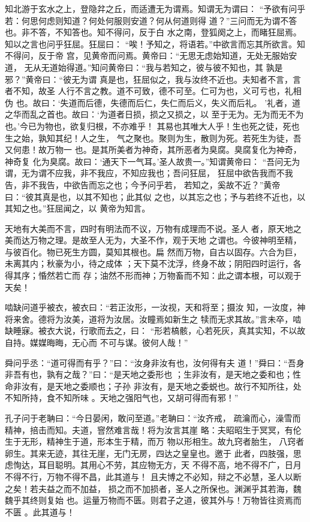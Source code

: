 \documentclass[12pt,UTF8]{ctexbook}
\begin{document}
知北游于玄水之上，登隐弅之丘，而适遭无为谓焉。知谓无为谓曰： “予欲有问乎若：何思何虑则知道？何处何服则安道？何从何道则得 道？”三问而无为谓不答也。非不答，不知答也。知不得问，反于白 水之南，登狐阕之上，而睹狂屈焉。知以之言也问乎狂屈。狂屈曰： “唉！予知之，将语若。”中欲言而忘其所欲言。知不得问，反于帝 宫，见黄帝而问焉。黄帝曰：“无思无虑始知道，无处无服始安道， 无从无道始得道。”知问黄帝曰：“我与若知之，彼与彼不知也，其 孰是邪？”黄帝曰：“彼无为谓 真是也，狂屈似之，我与汝终不近也。夫知者不言，言者不知，故圣 人行不言之教。道不可致，德不可至。仁可为也，义可亏也，礼相伪 也。故曰：‘失道而后德，失德而后仁，失仁而后义，失义而后礼。 ’礼者，道之华而乱之首也。故曰：‘为道者日损，损之又损之，以 至于无为。无为而无不为也。’今已为物也，欲复归根，不亦难乎！ 其易也其唯大人乎！生也死之徒，死也生之始，孰知其纪！人之生， 气之聚也。聚则为生，散则为死。若死生为徒，吾又何患！故万物一 也。是其所美者为神奇，其所恶者为臭腐。臭腐复化为神奇，神奇复 化为臭腐。故曰：‘通天下一气耳。’圣人故贵一。”知谓黄帝曰： “吾问无为谓，无为谓不应我，非不我应，不知应我也；吾问狂屈， 狂屈中欲告我而不我告，非不我告，中欲告而忘之也；今予问乎若， 若知之，奚故不近？”黄帝曰：“彼其真是也，以其不知也；此其似 之也，以其忘之也；予与若终不近也，以其知之也。”狂屈闻之，以 黄帝为知言。

天地有大美而不言，四时有明法而不议，万物有成理而不说。圣人 者，原天地之美而达万物之理。是故至人无为，大圣不作，观于天地 之谓也。今彼神明至精，与彼百化。物已死生方圆，莫知其根也。扁 然而万物，自古以固存。六合为巨，未离其内；秋豪为小，待之成体 ；天下莫不沈浮，终身不故；阴阳四时运行，各得其序；惛然若亡而 存；油然不形而神；万物畜而不知：此之谓本根，可以观于天矣！

啮缺问道乎被衣，被衣曰：“若正汝形，一汝视，天和将至；摄汝 知，一汝度，神将来舍。德将为汝美，道将为汝居。汝瞳焉如新生之 犊而无求其故。”言未卒，啮缺睡寐。被衣大说，行歌而去之，曰： “形若槁骸，心若死灰，真其实知，不以故自持。媒媒晦晦，无心而 不可与谋。彼何人哉！”

舜问乎丞：“道可得而有乎？”曰：“汝身非汝有也，汝何得有夫 道！”舜曰：“吾身非吾有也，孰有之哉？”曰：“是天地之委形也 ；生非汝有，是天地之委和也；性命非汝有，是天地之委顺也；子孙 非汝有，是天地之委蜕也。故行不知所往，处不知所持，食不知所味 。天地之强阳气也，又胡可得而有邪！”

孔子问于老聃曰：“今日晏闲，敢问至道。”老聃曰：“汝齐戒， 疏瀹而心，澡雪而精神，掊击而知。夫道，窨然难言哉！将为汝言其崖 略：夫昭昭生于冥冥，有伦生于无形，精神生于道，形本生于精，而万 物以形相生。故九窍者胎生， 八窍者卵生。其来无迹，其往无崖，无门无房，四达之皇皇也。邀于 此者，四肢强，思虑恂达，耳目聪明。其用心不劳，其应物无方，天 不得不高，地不得不广，日月不得不行，万物不得不昌，此其道与！ 且夫博之不必知，辩之不必慧，圣人以断之矣！若夫益之而不加益， 损之而不加损者，圣人之所保也。渊渊乎其若海，魏魏乎其终则复始 也。运量万物而不匮。则君子之道，彼其外与！万物皆往资焉而不匮 。此其道与！
\end{document}
